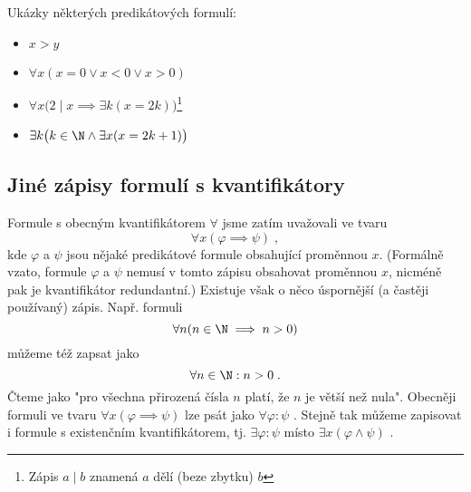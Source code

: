 \begin{example}
    Ukázky některých predikátových formulí:
    \begin{itemize}
        \item $x>y$
        \item $\forall x (x = 0 \lor x < 0 \lor x > 0)$
        \item $\forall x \big(2 \mid x \implies \exists k (x=2k)\big)$\footnote{Zápis $a \mid b$ znamená $a$ dělí (beze zbytku) $b$}
        \item $\exists k \big(k \in \N \land \exists x (x=2k+1)\big)$
    \end{itemize}
\end{example}

\subsection{Jiné zápisy formulí s kvantifikátory}
Formule s obecným kvantifikátorem $\forall$ jsme zatím uvažovali ve tvaru
\begin{equation*}
    \forall x(\varphi \implies \psi)\; ,
\end{equation*}
kde $\varphi$ a $\psi$ jsou nějaké predikátové formule obsahující proměnnou $x$. (Formálně vzato, formule $\varphi$ a $\psi$ nemusí v tomto zápisu obsahovat proměnnou $x$, nicméně pak je kvantifikátor redundantní.) Existuje však o něco úspornější (a častěji používaný) zápis. Např. formuli
\begin{equation*}
    \forall n (n \in \N \implies n > 0)
\end{equation*}
můžeme též zapsat jako
\begin{equation*}
    \forall n \in \N : n > 0\; .
\end{equation*}
Čteme jako "pro všechna přirozená čísla $n$ platí, že $n$ je větší než nula". Obecněji formuli ve tvaru $\forall x(\varphi \implies \psi)$ lze psát jako $\forall \varphi : \psi$ . Stejně tak můžeme zapisovat i formule s existenčním kvantifikátorem, tj. $\exists \varphi : \psi$ místo $\exists x (\varphi \land \psi)$ .
\medskip

